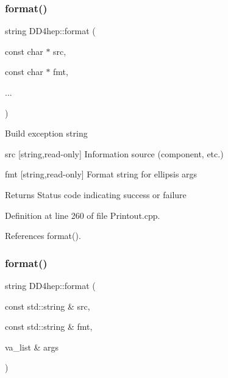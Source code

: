 \hypertarget{namespace_d_d4hep_a6d0802d60cd32a48326f689ffedd4dfb}{}\label{namespace_d_d4hep_a6d0802d60cd32a48326f689ffedd4dfb} 
\subsubsection{\texorpdfstring{format()}{format()}\hspace{0.1cm}{\footnotesize\ttfamily [2/4]}}
{\footnotesize\ttfamily string D\+D4hep\+::format (\begin{DoxyParamCaption}\item[{const char $\ast$}]{src,  }\item[{const char $\ast$}]{fmt,  }\item[{}]{... }\end{DoxyParamCaption})}

Build exception string \begin{DoxyItemize}
\item src \mbox{[}string,read-\/only\mbox{]} Information source (component, etc.) \item fmt \mbox{[}string,read-\/only\mbox{]} Format string for ellipsis args \begin{DoxyReturn}{Returns}
Status code indicating success or failure 
\end{DoxyReturn}
\end{DoxyItemize}


Definition at line 260 of file Printout.\+cpp.



References format().

\hypertarget{namespace_d_d4hep_adf74a1091b13572f6d13c50fc56c3b39}{}\label{namespace_d_d4hep_adf74a1091b13572f6d13c50fc56c3b39} 
\subsubsection{\texorpdfstring{format()}{format()}\hspace{0.1cm}{\footnotesize\ttfamily [3/4]}}
{\footnotesize\ttfamily string D\+D4hep\+::format (\begin{DoxyParamCaption}\item[{const std\+::string \&}]{src,  }\item[{const std\+::string \&}]{fmt,  }\item[{va\+\_\+list \&}]{args }\end{DoxyParamCaption})}

